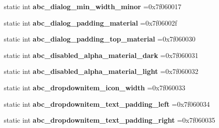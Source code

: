 \begin{DoxyCompactItemize}
\item 
\mbox{\label{classandroid_1_1support_1_1design_1_1R_1_1dimen_aa74e3c3c5a194cfd737c078d9d0247ee}} 
static int {\bfseries abc\+\_\+dialog\+\_\+min\+\_\+width\+\_\+minor} =0x7f060017
\item 
\mbox{\label{classandroid_1_1support_1_1design_1_1R_1_1dimen_a9dcdb40ae09cebba80e50419f67ff49e}} 
static int {\bfseries abc\+\_\+dialog\+\_\+padding\+\_\+material} =0x7f06002f
\item 
\mbox{\label{classandroid_1_1support_1_1design_1_1R_1_1dimen_a5f6545002968ce9709366230a4595604}} 
static int {\bfseries abc\+\_\+dialog\+\_\+padding\+\_\+top\+\_\+material} =0x7f060030
\item 
\mbox{\label{classandroid_1_1support_1_1design_1_1R_1_1dimen_aa762276ed3714bb3069eb49d79a1bfb2}} 
static int {\bfseries abc\+\_\+disabled\+\_\+alpha\+\_\+material\+\_\+dark} =0x7f060031
\item 
\mbox{\label{classandroid_1_1support_1_1design_1_1R_1_1dimen_a2b1643d0b1538933c172363baa96e0a1}} 
static int {\bfseries abc\+\_\+disabled\+\_\+alpha\+\_\+material\+\_\+light} =0x7f060032
\item 
\mbox{\label{classandroid_1_1support_1_1design_1_1R_1_1dimen_af8c26cab18629ccca27f6bcdb5e2ecc6}} 
static int {\bfseries abc\+\_\+dropdownitem\+\_\+icon\+\_\+width} =0x7f060033
\item 
\mbox{\label{classandroid_1_1support_1_1design_1_1R_1_1dimen_a5c4ae0f1c16d25e9fd58fb1d477c662e}} 
static int {\bfseries abc\+\_\+dropdownitem\+\_\+text\+\_\+padding\+\_\+left} =0x7f060034
\item 
\mbox{\label{classandroid_1_1support_1_1design_1_1R_1_1dimen_a9fce42816fcd8cdfe2cde6d685188ed9}} 
static int {\bfseries abc\+\_\+dropdownitem\+\_\+text\+\_\+padding\+\_\+right} =0x7f060035

\end{DoxyCompactItemize}
